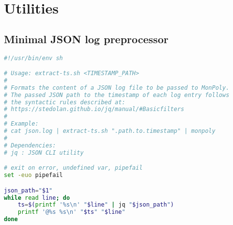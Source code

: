 \chapter{Utilities}

\section{Minimal JSON log preprocessor}
\begin{lstlisting}[style=sourcecode,language=bash, caption=minimal JSON log preprocessor shell script, label=code:minimal_json_preprocessor]
#!/usr/bin/env sh

# Usage: extract-ts.sh <TIMESTAMP_PATH>
#
# Formats the content of a JSON log file to be passed to MonPoly.
# The passed JSON path to the timestamp of each log entry follows
# the syntactic rules described at:
# https://stedolan.github.io/jq/manual/#Basicfilters
#
# Example:
# cat json.log | extract-ts.sh ".path.to.timestamp" | monpoly
# 
# Dependencies:
# jq : JSON CLI utility

# exit on error, undefined var, pipefail
set -euo pipefail

json_path="$1"
while read line; do
    ts=$(printf '%s\n' "$line" | jq "$json_path")
    printf '@%s %s\n' "$ts" "$line"
done
\end{lstlisting}
